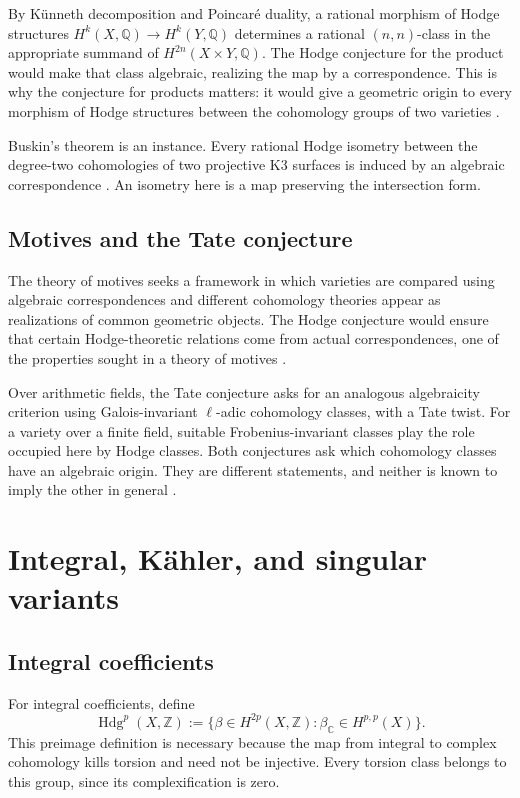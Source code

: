 \documentclass[11pt,reqno]{amsart}
\theoremstyle{definition}
\theoremstyle{remark}
\numberwithin{equation}{section}
\newcommand{\C}{\mathbb{C}}
\newcommand{\Z}{\mathbb{Z}}
\newcommand{\Q}{\mathbb{Q}}
\DeclareMathOperator{\Hdg}{Hdg}
\begin{document}
By K\"unneth decomposition and Poincar\'e duality, a rational morphism
of Hodge structures $H^k(X,\Q)\to H^k(Y,\Q)$ determines a rational
$(n,n)$-class in the appropriate summand of $H^{2n}(X\times Y,\Q)$.
The Hodge conjecture for the product would make that class algebraic,
realizing the map by a correspondence. This is why the conjecture for
products matters: it would give a geometric origin to every morphism of
Hodge structures between the cohomology groups of two varieties
\cite{voisin2025coniveau}.

Buskin's theorem is an instance. Every rational Hodge isometry between the
degree-two cohomologies of two projective K3 surfaces is induced by an
algebraic correspondence \cite{buskin2019}. An isometry here is a map
preserving the intersection form.

\subsection{Motives and the Tate conjecture}

The theory of motives seeks a framework in which varieties are compared
using algebraic correspondences and different cohomology theories appear
as realizations of common geometric objects. The Hodge conjecture would
ensure that certain Hodge-theoretic relations come from actual
correspondences, one of the properties sought in a theory of motives \cite{delignecmi2006}.

Over arithmetic fields, the Tate conjecture asks for an analogous
algebraicity criterion using Galois-invariant $\ell$-adic cohomology
classes, with a Tate twist. For a variety over a finite field, suitable
Frobenius-invariant classes play the role occupied here by Hodge classes.
Both conjectures ask which cohomology classes have an algebraic origin.
They are different statements, and neither is known to imply the other in
general \cite{tate1965,milne2008tate}.

\section{Integral, K\"ahler, and singular variants}\label{sec:limits}

\subsection{Integral coefficients}

For integral coefficients, define
\[
 \Hdg^p(X,\Z):=
 \{\beta\in H^{2p}(X,\Z):\beta_{\C}\in H^{p,p}(X)\}.
\]
This preimage definition is necessary because the map from integral to
complex cohomology kills torsion and need not be injective. Every torsion
class belongs to this group, since its complexification is zero.
\end{document}
